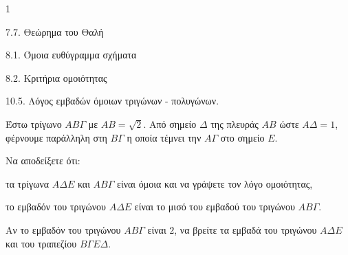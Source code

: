 \begin{ylh}{1}
    \item 7.7. Θεώρημα του Θαλή
    \item 8.1. Όμοια ευθύγραμμα σχήματα
    \item 8.2. Κριτήρια ομοιότητας
    \item 10.5. Λόγος εμβαδών όμοιων τριγώνων - πολυγώνων.
\end{ylh}
\begin{figure} %
    \centering
\end{figure}
Έστω τρίγωνο $AB\Gamma$ με $AB = \sqrt{2}$. Από σημείο $\Delta$ της πλευράς $AB$ ώστε $A\Delta = 1$, φέρνουμε παράλληλη στη $B\Gamma$ η οποία τέμνει την $A\Gamma$ στο σημείο $E$.

\begin{alist}
\item Να αποδείξετε ότι:
    \begin{rlist}
    \item τα τρίγωνα $A\Delta E$ και $AB\Gamma$ είναι όμοια και να γράψετε τον λόγο ομοιότητας,
    \item το εμβαδόν του τριγώνου $A\Delta E$ είναι το μισό του εμβαδού του τριγώνου $AB\Gamma$. 
    \end{rlist}
\item Αν το εμβαδόν του τριγώνου $AB\Gamma$ είναι $2$, να βρείτε τα εμβαδά του τριγώνου $A\Delta E$ και του τραπεζίου $B\Gamma E\Delta$. 
\end{alist}